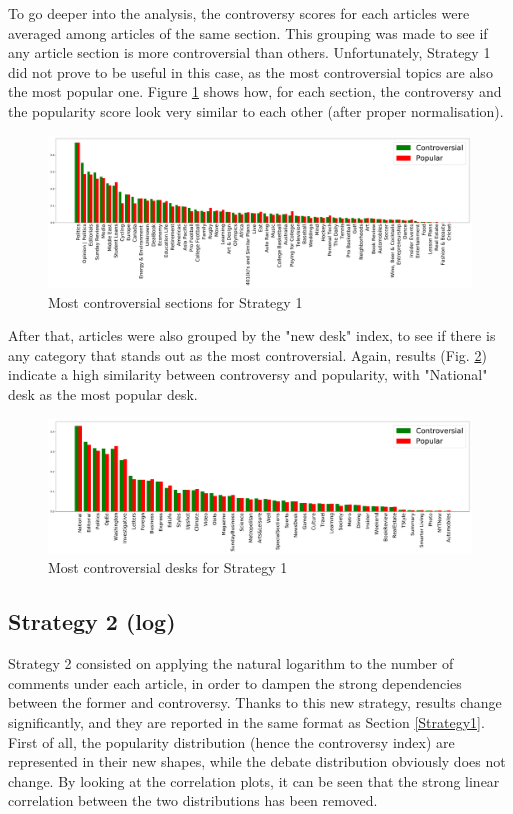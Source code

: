 To go deeper into the analysis, the controversy scores for each articles were averaged among articles of the same section. This grouping was made to see if any article section is more controversial than others. Unfortunately, Strategy 1 did not prove to be useful in this case, as the most controversial topics are also the most popular one. Figure \ref{RG1} shows how, for each section, the controversy and the popularity score look very similar to each other (after proper normalisation).

\begin{figure}
\centering
\includegraphics[width=\tw]{Pictures/Strat1SN.pdf}
\caption{Most controversial sections for Strategy 1}
\label{RG1}
\end{figure}

After that, articles were also grouped by the "new desk" index, to see if there is any category that stands out as the most controversial. Again, results (Fig. \ref{RG1nd}) indicate a high similarity between controversy and popularity, with "National" desk as the most popular desk.

\begin{figure}
\centering
\includegraphics[width=\tw]{Pictures/Strat1ND.pdf}
\caption{Most controversial desks for Strategy 1}
\label{RG1nd}
\end{figure}

\subsection{Strategy 2 (log)}

Strategy 2 consisted on applying the natural logarithm to the number of comments under each article, in order to dampen the strong dependencies between the former and controversy. Thanks to this new strategy, results change significantly, and they are reported in the same format as Section \ref{Strategy1}.
First of all, the popularity distribution (hence the controversy index) are represented in their new shapes, while the debate distribution obviously does not change.
By looking at the correlation plots, it can be seen that the strong linear correlation between the two distributions has been removed.


